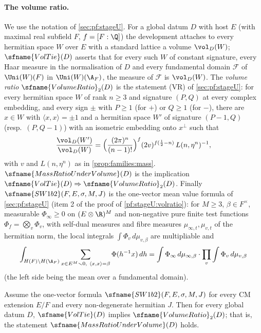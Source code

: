 \paragraph{The volume ratio.} We use the notation of \cref{sec:pf:stageU}. For a global datum $D$ with host $E$ (with maximal real
subfield $F$, $f=[F:\Q]$) the development attaches to every hermitian space $W$ over $E$ with a standard lattice a volume $\vol_D(W)$;
$\sfname{VolTie}(D)$ asserts that for every such $W$ of constant signature, every Haar measure in the normalisation of $D$ and every
fundamental domain $\mathcal F$ of $\Uni(W)(F)$ in $\Uni(W)(\A_F)$, the measure of $\mathcal F$ is $\vol_D(W)$. The \emph{volume ratio}
$\sfname{VolumeRatio}_2(D)$ is the statement (VR) of \cref{sec:pf:stageU}: for every hermitian space $W$ of rank $n\ge3$ and signature
$(P,Q)$ at every complex embedding, and every sign $\pm$ with $P\ge1$ (for $+$) or $Q\ge1$ (for $-$), there are $x\in W$ with
$\langle x,x\rangle=\pm1$ and a hermitian space $W'$ of signature $(P-1,Q)$ (resp.\ $(P,Q-1)$) with an isometric embedding onto
$x^\perp$ such that
\begin{equation}\label{eq:pf:sh-div:vr}
\frac{\vol_D(W')}{\vol_D(W)}=\Bigl(\frac{(2\pi)^n}{(n-1)!}\Bigr)^{f}(2v)^{f(\frac12-n)}\,L(n,\eta^n)^{-1},
\end{equation}
with $v$ and $L(n,\eta^n)$ as in \cref{prop:families:mass}. $\sfname{MassRatioUnderVolume}(D)$ is the implication
$\sfname{VolTie}(D)\Rightarrow\sfname{VolumeRatio}_2(D)$. Finally $\sfname{SW1b2}(F,E,\sigma,M,J)$ is the one-vector mean value formula of
\cref{sec:pf:stageU} (item 2 of the proof of \cref{pf:stageU:volratio}): for $M\ge3$, $\beta\in F^\times$, measurable
$\Phi_\infty\ge0$ on $(E\otimes\R)^M$ and non-negative pure finite test functions $\Phi_f=\bigotimes_v\Phi_v$, with self-dual measures
and fibre measures $\mu_{\infty,t},\mu_{v,t}$ of the hermitian norm, the local integrals $\int\Phi_v\,d\mu_{v,\beta}$ are multipliable and
\[
\int_{H(F)\backslash H(\A_F)}\sum_{x\in E^M\smallsetminus0,\ \langle x,x\rangle=\beta}\Phi(h^{-1}x)\,dh
=\int\Phi_\infty\,d\mu_{\infty,\beta}\cdot\prod_v\int\Phi_v\,d\mu_{v,\beta}
\]
(the left side being the mean over a fundamental domain).

\begin{theorem}\label{pf:sh-div:volratio}
Assume the one-vector formula $\sfname{SW1b2}(F,E,\sigma,M,J)$ for every CM extension $E/F$ and every non-degenerate hermitian $J$.
Then for every global datum $D$, $\sfname{VolTie}(D)$ implies $\sfname{VolumeRatio}_2(D)$; that is, the statement
$\sfname{MassRatioUnderVolume}(D)$ holds.
\end{theorem}

